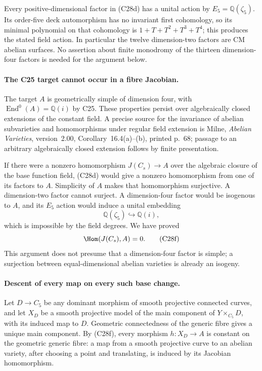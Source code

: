 \documentclass[11pt]{article}
\newcommand{\Q}{\mathbb Q}\newcommand{\C}{\mathbb C}\newcommand{\Z}{\mathbb Z}\newcommand{\R}{\mathbb R}\newcommand{\A}{\mathbb A}\newcommand{\OO}{\mathcal O}
\theoremstyle{definition}\newtheorem{definition}[theorem]{Definition}\newtheorem{remark}[theorem]{Remark}
\begin{document}
Every positive-dimensional factor in (C28d) has a
unital action by $E_5=\Q(\zeta_5)$.  Its order-five
deck automorphism has no invariant first cohomology,
so its minimal polynomial on that cohomology is
$1+T+T^2+T^3+T^4$; this produces the stated field action.
In particular the twelve dimension-two factors are
CM abelian surfaces.  No assertion about finite
monodromy of the thirteen dimension-four factors is
needed for the argument below.

\paragraph{The C25 target cannot occur in a fibre Jacobian.}
The target $A$ is geometrically simple of dimension four,
with $\operatorname{End}^0(A)=\Q(i)$ by C25.
These properties persist over algebraically closed
extensions of the constant field.  A precise source
for the invariance of abelian subvarieties and
homomorphisms under regular field extension is Milne,
\emph{Abelian Varieties}, version~2.00, Corollary~16.4(a)--(b),
printed p.~68; passage to an arbitrary algebraically
closed extension follows by finite presentation.

If there were a nonzero homomorphism $J(C_s)\to A$
over the algebraic closure of the base function field,
(C28d) would give a nonzero homomorphism from one of
its factors to $A$.  Simplicity of $A$ makes that
homomorphism surjective.  A dimension-two factor
cannot surject.  A dimension-four factor would be
isogenous to $A$, and its $E_5$ action would induce
a unital embedding
\[
                  \Q(\zeta_5)\hookrightarrow\Q(i),
\]
which is impossible by the field degrees.  We have proved
\[
                         \Hom(J(C_s),A)=0.       \tag{C28f}
\]
This argument does not presume that a dimension-four
factor is simple; a surjection between equal-dimensional
abelian varieties is already an isogeny.

\paragraph{Descent of every map on every such base change.}
Let $D\to C_5$ be any dominant morphism of smooth
projective connected curves, and let $X_D$ be a smooth
projective model of the main component of
$Y\times_{C_5}D$, with its induced map to $D$.
Geometric connectedness of the generic fibre gives
a unique main component.  By (C28f), every morphism
$h:X_D\to A$ is constant on the geometric generic
fibre: a map from a smooth projective curve to an
abelian variety, after choosing a point and translating,
is induced by its Jacobian homomorphism.
\end{document}
